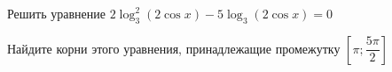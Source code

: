 \begin{ex}
	\begin{condition}
		\begin{enumcols}[label=\asbuk*)]
			\item Решить уравнение \( 2\log^2_3(2\cos x)-5\log_3(2\cos x)=0 \)
			\item Найдите корни этого уравнения, принадлежащие промежутку \( \left[ \pi;\dfrac{5\pi}{2} \right] \)
		\end{enumcols}
	\end{condition}
\end{ex}